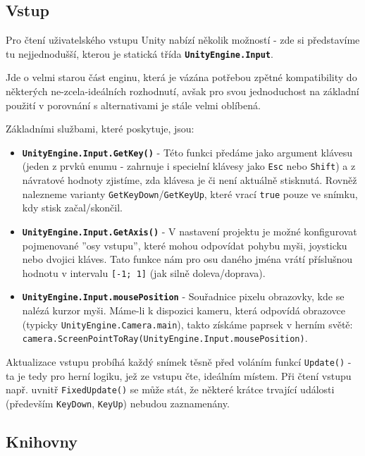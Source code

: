 \pagebreak

\subsection{Vstup} \label{unityInputExplanationSubsection}

Pro čtení uživatelského vstupu Unity nabízí několik možností - zde si představíme tu nejjednodušší, kterou je statická třída \textbf{\texttt{UnityEngine.Input}}.

Jde o velmi starou část enginu, která je vázána potřebou zpětné kompatibility do některých ne-zcela-ideálních rozhodnutí, avšak pro svou jednoduchost na základní použití v porovnání s alternativami je stále velmi oblíbená. 

Základními službami, které poskytuje, jsou:
\begin{itemize}
    \item \textbf{\texttt{UnityEngine.Input.GetKey()}} - Této funkci předáme jako argument klávesu (jeden z prvků enumu - zahrnuje i specielní klávesy jako \texttt{Esc} nebo \texttt{Shift}) a z návratové hodnoty zjistíme, zda klávesa je či není aktuálně stisknutá. Rovněž nalezneme varianty \texttt{GetKeyDown}/\texttt{GetKeyUp}, které vrací \texttt{true} pouze ve snímku, kdy stisk začal/skončil.
    \item \textbf{\texttt{UnityEngine.Input.GetAxis()}} - V nastavení projektu je možné konfigurovat pojmenované ''osy vstupu'', které mohou odpovídat pohybu myši, joysticku nebo dvojici kláves. Tato funkce nám pro osu daného jména vrátí příslušnou hodnotu v intervalu \texttt{[-1; 1]} (jak silně doleva/doprava).
    \item \textbf{\texttt{UnityEngine.Input.mousePosition}} - Souřadnice pixelu obrazovky, kde se nalézá kurzor myši. Máme-li k dispozici kameru, která odpovídá obrazovce (typicky \texttt{UnityEngine.Camera.main}), takto získáme paprsek v herním světě: \texttt{camera.ScreenPointToRay(UnityEngine.Input.mousePosition)}.  
\end{itemize}

Aktualizace vstupu probíhá každý snímek těsně před voláním funkcí \texttt{Update()} - ta je tedy pro herní logiku, jež ze vstupu čte, ideálním místem. Při čtení vstupu např. uvnitř \texttt{FixedUpdate()} se může stát, že některé krátce trvající události (především \texttt{KeyDown}, \texttt{KeyUp}) nebudou zaznamenány.

\subsection{Knihovny}

